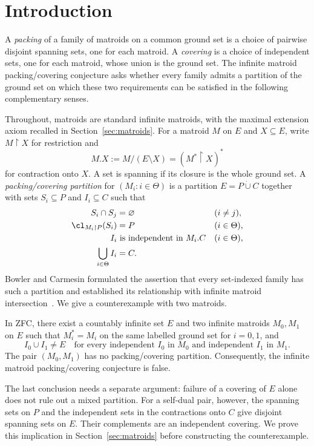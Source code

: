 \section{Introduction}\label{sec:introduction}

A \emph{packing} of a family of matroids on a common ground set is a choice
of pairwise disjoint spanning sets, one for each matroid. A \emph{covering}
is a choice of independent sets, one for each matroid, whose union is the
ground set. The infinite matroid packing/covering conjecture asks whether
every family admits a partition of the ground set on which these two
requirements can be satisfied in the following complementary senses.

Throughout, matroids are standard infinite matroids, with the maximal
extension axiom recalled in Section~\ref{sec:matroids}. For a matroid $M$
on $E$ and $X\subseteq E$, write $M\!\upharpoonright X$ for restriction
and
\[
 M.X:=M/(E\setminus X)=(M^*\!\upharpoonright X)^*
\]
for contraction onto $X$. A set is spanning if its closure is the whole
ground set. A \emph{packing/covering partition} for $(M_i:i\in\Theta)$ is
a partition $E=P\dot\cup C$ together with sets $S_i\subseteq P$ and
$I_i\subseteq C$ such that
\begin{align*}
 S_i\cap S_j&=\varnothing &&(i\ne j),\\
 \cl_{M_i\upharpoonright P}(S_i)&=P &&(i\in\Theta),\\
 I_i&\text{ is independent in }M_i.C &&(i\in\Theta),\\
 \bigcup_{i\in\Theta}I_i&=C.
\end{align*}
Bowler and Carmesin formulated the assertion that every set-indexed family
has such a partition and established its relationship with infinite
matroid intersection~\cite[Conjecture~1.3 and Corollary~3.9]{BowlerCarmesin2015}. We give a counterexample
with two matroids.

\begin{theorem}\label{thm:main}
In ZFC, there exist a countably infinite set $E$ and two infinite matroids
$M_0,M_1$ on $E$ such that $M_i^*=M_i$ on the same labelled ground set for
$i=0,1$, and
\[
 I_0\cup I_1\ne E
 \quad\text{for every independent }I_0\text{ in }M_0
 \text{ and independent }I_1\text{ in }M_1.
\]
The pair $(M_0,M_1)$ has no packing/covering partition. Consequently, the
infinite matroid packing/covering conjecture is false.
\end{theorem}

The last conclusion needs a separate argument: failure of a covering of
$E$ alone does not rule out a mixed partition. For a self-dual pair,
however, the spanning sets on $P$ and the independent sets in the
contractions onto $C$ give disjoint spanning sets on $E$. Their complements
are an independent covering. We prove this implication in
Section~\ref{sec:matroids} before constructing the counterexample.

